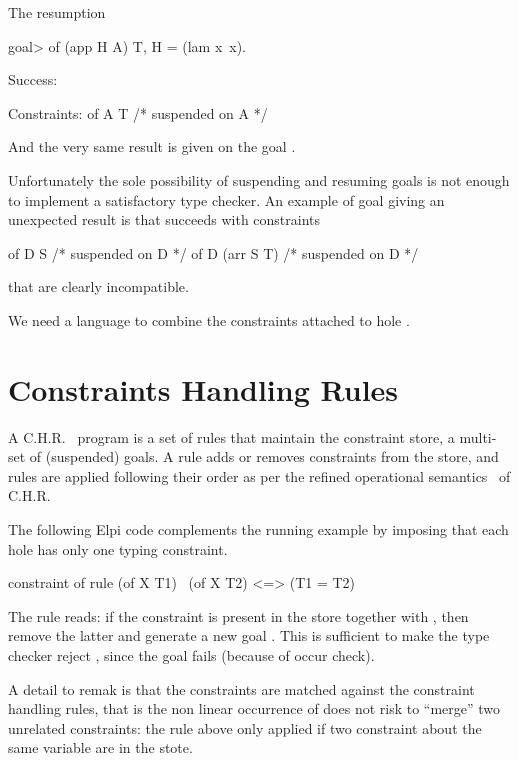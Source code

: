\documentclass[a4paper, 11pt]{book}
\begin{document}
The resumption 

\begin{elpicode}
goal> of (app H A) T, H = (lam x\ x).

Success:

Constraints:
  of A T  /* suspended on A */
\end{elpicode}

And the very same result is given on the goal .
  
Unfortunately the sole possibility of suspending and resuming goals is
not enough to implement a satisfactory type checker. An example of
goal giving an unexpected result is 
that succeeds with constraints

\begin{elpicode}
  of D S  /* suspended on D */
  of D (arr S T)  /* suspended on D */
\end{elpicode}

that are clearly incompatible.

We need a language to combine the constraints attached to hole .

\section{Constraints Handling Rules}

A C.H.R.~\cite{chr}
program is a set of rules that maintain the constraint store, a
multi-set of (suspended) goals. A rule adds or removes constraints
from the store, and rules are applied following their order
as per the refined operational semantics~\cite{10.1007/978-3-540-27775-0_7}
of C.H.R.

The following Elpi code complements the running example by
imposing that each hole has only one typing constraint.

\begin{elpicode}
constraint of {
  rule (of X T1) \ (of X T2) <=> (T1 = T2)
}
\end{elpicode}

The rule reads: if the constraint  is present
in the store together with , then remove
the latter and generate a new goal .
This is sufficient to make the type checker
reject , since the goal
 fails (because of occur check).

A detail to remak is that the constraints are matched against
the constraint handling rules, that is the non linear occurrence
of  does not risk to ``merge'' two unrelated constraints:
the rule above only applied if two constraint about the same variable
are in the stote.
\end{document}
